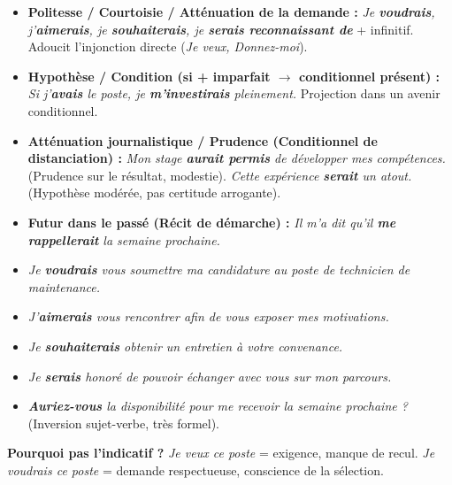 \documentclass[11pt]{article}
\begin{document}
\begin{propriete}
\begin{itemize}
    \item \textbf{Politesse / Courtoisie / Atténuation de la demande :} \emph{Je \textbf{voudrais}, j'\textbf{aimerais}, je \textbf{souhaiterais}, je \textbf{serais reconnaissant de}} + infinitif. Adoucit l'injonction directe (\emph{Je veux, Donnez-moi}).
    \item \textbf{Hypothèse / Condition (si + imparfait $\rightarrow$ conditionnel présent) :} \emph{Si j'\textbf{avais} le poste, je \textbf{m'investirais} pleinement.} Projection dans un avenir conditionnel.
    \item \textbf{Atténuation journalistique / Prudence (Conditionnel de distanciation) :} \emph{Mon stage \textbf{aurait permis} de développer mes compétences.} (Prudence sur le résultat, modestie). \emph{Cette expérience \textbf{serait} un atout.} (Hypothèse modérée, pas certitude arrogante).
    \item \textbf{Futur dans le passé (Récit de démarche) :} \emph{Il m'a dit qu'il \textbf{me rappellerait} la semaine prochaine.}
\end{itemize}
\end{propriete}

\begin{exemplebox}
\begin{itemize}
    \item \emph{Je \textbf{voudrais} vous soumettre ma candidature au poste de technicien de maintenance.}
    \item \emph{J'\textbf{aimerais} vous rencontrer afin de vous exposer mes motivations.}
    \item \emph{Je \textbf{souhaiterais} obtenir un entretien à votre convenance.}
    \item \emph{Je \textbf{serais} honoré de pouvoir échanger avec vous sur mon parcours.}
    \item \emph{\textbf{Auriez-vous} la disponibilité pour me recevoir la semaine prochaine ?} (Inversion sujet-verbe, très formel).
\end{itemize}
\textbf{Pourquoi pas l'indicatif ?} \emph{Je veux ce poste} = exigence, manque de recul. \emph{Je voudrais ce poste} = demande respectueuse, conscience de la sélection.
\end{exemplebox}
\end{document}
